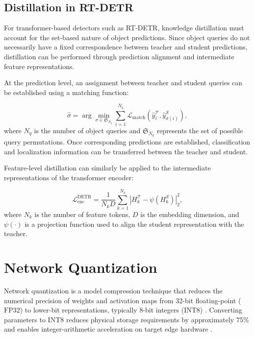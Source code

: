 \subsection{Distillation in RT-DETR}

For transformer-based detectors such as RT-DETR, knowledge distillation must account for the set-based nature of object predictions. Since object queries do not necessarily have a fixed correspondence between teacher and student predictions, distillation can be performed through prediction alignment and intermediate feature representations.

At the prediction level, an assignment between teacher and student queries can be established using a matching function:

\begin{equation}
\hat{\sigma} =
\arg\min_{\sigma \in \mathfrak{S}_{N_q}}
\sum_{i=1}^{N_q}
\mathcal{L}_{\mathrm{match}}
\left(
\hat{y}_i^{\mathcal{T}},
\hat{y}_{\sigma(i)}^{\mathcal{S}}
\right),
\end{equation}
where $N_q$ is the number of object queries and $\mathfrak{S}_{N_q}$ represents the set of possible query permutations. Once corresponding predictions are established, classification and localization information can be transferred between the teacher and student.

Feature-level distillation can similarly be applied to the intermediate representations of the transformer encoder:

\begin{equation}
\mathcal{L}_{\mathrm{enc}}^{\mathrm{DETR}} =
\frac{1}{N_kD}
\sum_{k=1}^{N_k}
\left|
H_k^{\mathcal{T}} -
\psi(H_k^{\mathcal{S}})
\right|_2^2,
\end{equation}
where $N_k$ is the number of feature tokens, $D$ is the embedding dimension, and $\psi(\cdot)$ is a projection function used to align the student representation with the teacher.

\section{Network Quantization}
\label{sec:quantization}

Network quantization is a model compression technique that reduces the numerical precision of weights and activation maps from 32-bit floating-point ($\text{FP32}$) to lower-bit representations, typically 8-bit integers ($\text{INT8}$) \cite{Jacob2018, Krishnamoorthi2018}. Converting parameters to $\text{INT8}$ reduces physical storage requirements by approximately 75\% and enables integer-arithmetic acceleration on target edge hardware \cite{Nagel2021}.

